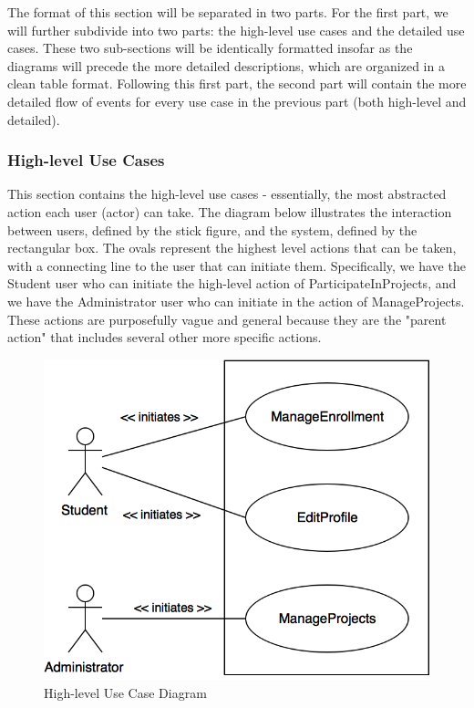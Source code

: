\documentclass[12pt,letterpaper]{article}
\begin{document}
The format of this section will be separated in two parts. For the first part, we will further subdivide into two parts: the high-level use cases and the detailed use cases. 
These two sub-sections will be identically formatted insofar as the diagrams will precede the more detailed descriptions, which are organized in a clean table format. Following
this first part, the second part will contain the more detailed flow of events for every use case in the previous part (both high-level and detailed).

\subsubsection*{High-level Use Cases}

This section contains the high-level use cases - essentially, the most abstracted action each user (actor) can take. The diagram below illustrates the interaction between
users, defined by the stick figure, and the system, defined by the rectangular box. The ovals represent the highest level actions that can be taken, with a connecting line to
the user that can initiate them. Specifically, we have the Student user who can initiate the high-level action of ParticipateInProjects, and we have the Administrator user who can
initiate in the action of ManageProjects. These actions are purposefully vague and general because they are the "parent action" that includes several other more specific actions.
\vspace{1em}

\begin{figure}[H]
	\centering{}
	\includegraphics[scale=0.3]{imgs/high-level-use-case-diagram.png}
	\caption{High-level Use Case Diagram}
\end{figure}
\end{document}
